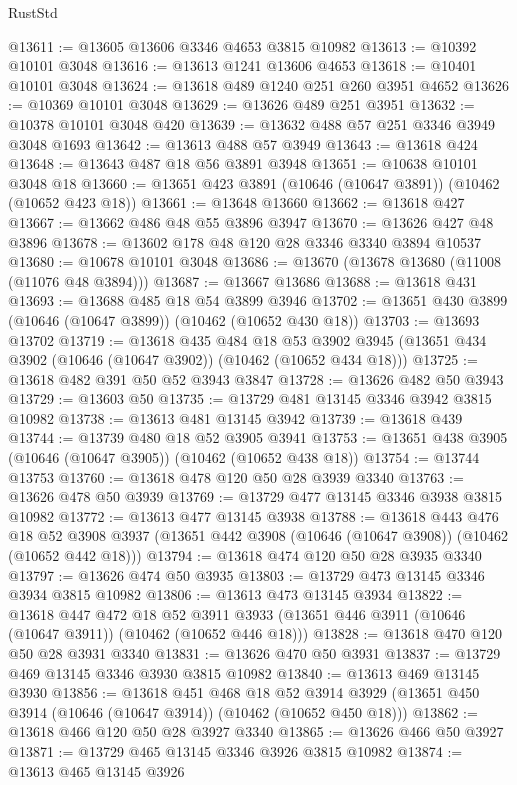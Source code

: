 \begin{lexlean}{RustStd}
\begin{coremodule}
@13611 := @13605 @13606 @3346 @4653 @3815 @10982
@13613 := @10392 @10101 @3048
@13616 := @13613 @1241 @13606 @4653
@13618 := @10401 @10101 @3048
@13624 := @13618 @489 @1240 @251 @260 @3951 @4652
@13626 := @10369 @10101 @3048
@13629 := @13626 @489 @251 @3951
@13632 := @10378 @10101 @3048 @420
@13639 := @13632 @488 @57 @251 @3346 @3949 @3048 @1693
@13642 := @13613 @488 @57 @3949
@13643 := @13618 @424
@13648 := @13643 @487 @18 @56 @3891 @3948
@13651 := @10638 @10101 @3048 @18
@13660 := @13651 @423 @3891 (@10646 (@10647 @3891)) (@10462 (@10652 @423 @18))
@13661 := @13648 @13660
@13662 := @13618 @427
@13667 := @13662 @486 @48 @55 @3896 @3947
@13670 := @13626 @427 @48 @3896
@13678 := @13602 @178 @48 @120 @28 @3346 @3340 @3894 @10537
@13680 := @10678 @10101 @3048
@13686 := @13670 (@13678 @13680 (@11008 (@11076 @48 @3894)))
@13687 := @13667 @13686
@13688 := @13618 @431
@13693 := @13688 @485 @18 @54 @3899 @3946
@13702 := @13651 @430 @3899 (@10646 (@10647 @3899)) (@10462 (@10652 @430 @18))
@13703 := @13693 @13702
@13719 := @13618
    @435
    @484
    @18
    @53
    @3902
    @3945
    (@13651 @434 @3902 (@10646 (@10647 @3902)) (@10462 (@10652 @434 @18)))
@13725 := @13618 @482 @391 @50 @52 @3943 @3847
@13728 := @13626 @482 @50 @3943
@13729 := @13603 @50
@13735 := @13729 @481 @13145 @3346 @3942 @3815 @10982
@13738 := @13613 @481 @13145 @3942
@13739 := @13618 @439
@13744 := @13739 @480 @18 @52 @3905 @3941
@13753 := @13651 @438 @3905 (@10646 (@10647 @3905)) (@10462 (@10652 @438 @18))
@13754 := @13744 @13753
@13760 := @13618 @478 @120 @50 @28 @3939 @3340
@13763 := @13626 @478 @50 @3939
@13769 := @13729 @477 @13145 @3346 @3938 @3815 @10982
@13772 := @13613 @477 @13145 @3938
@13788 := @13618
    @443
    @476
    @18
    @52
    @3908
    @3937
    (@13651 @442 @3908 (@10646 (@10647 @3908)) (@10462 (@10652 @442 @18)))
@13794 := @13618 @474 @120 @50 @28 @3935 @3340
@13797 := @13626 @474 @50 @3935
@13803 := @13729 @473 @13145 @3346 @3934 @3815 @10982
@13806 := @13613 @473 @13145 @3934
@13822 := @13618
    @447
    @472
    @18
    @52
    @3911
    @3933
    (@13651 @446 @3911 (@10646 (@10647 @3911)) (@10462 (@10652 @446 @18)))
@13828 := @13618 @470 @120 @50 @28 @3931 @3340
@13831 := @13626 @470 @50 @3931
@13837 := @13729 @469 @13145 @3346 @3930 @3815 @10982
@13840 := @13613 @469 @13145 @3930
@13856 := @13618
    @451
    @468
    @18
    @52
    @3914
    @3929
    (@13651 @450 @3914 (@10646 (@10647 @3914)) (@10462 (@10652 @450 @18)))
@13862 := @13618 @466 @120 @50 @28 @3927 @3340
@13865 := @13626 @466 @50 @3927
@13871 := @13729 @465 @13145 @3346 @3926 @3815 @10982
@13874 := @13613 @465 @13145 @3926

\end{coremodule}
\end{lexlean}
